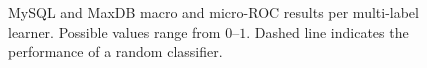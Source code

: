 \documentclass[smallextended]{svjour3}       %
\begin{document}

\begin{figure}[t]
\centering
{}
\caption[]{MySQL and MaxDB macro and micro-ROC results per multi-label learner. Possible values range from $0$--$1$.  Dashed line indicates the performance of a random classifier.
}
\label{fig:mulan}
\end{figure}
\end{document}
